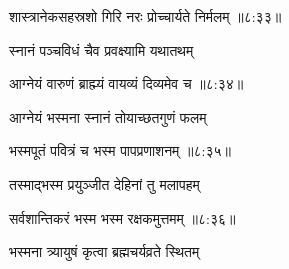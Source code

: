 

\nemslokad

{\devanagarifont शास्त्रानेकसहस्रशो गिरि नरः प्रोच्चार्यते निर्मलम् {॥८:३३॥} \veg\dontdisplaylinenum }%

\vers



{\devanagarifont स्नानं पञ्चविधं चैव प्रवक्ष्यामि यथातथम् \thinspace{\dandab} \dontdisplaylinenum }%


{\devanagarifont आग्नेयं वारुणं ब्राह्म्यं वायव्यं दिव्यमेव च {॥८:३४॥} \veg\dontdisplaylinenum }%



{\devanagarifont आग्नेयं भस्मना स्नानं तोयाच्छतगुणं फलम् \thinspace{\dandab} \dontdisplaylinenum }%


{\devanagarifont भस्मपूतं पवित्रं च भस्म पापप्रणाशनम् {॥८:३५॥} \veg\dontdisplaylinenum }%
 
{\devanagarifont तस्माद्भस्म प्रयुञ्जीत देहिनां तु मलापहम् \thinspace{\dandab} \dontdisplaylinenum }%


{\devanagarifont सर्वशान्तिकरं भस्म भस्म रक्षकमुत्तमम् {॥८:३६॥} \veg\dontdisplaylinenum }%

{\devanagarifont भस्मना त्र्यायुषं कृत्वा ब्रह्मचर्यव्रते स्थितम् \thinspace{\dandab} \dontdisplaylinenum }%

